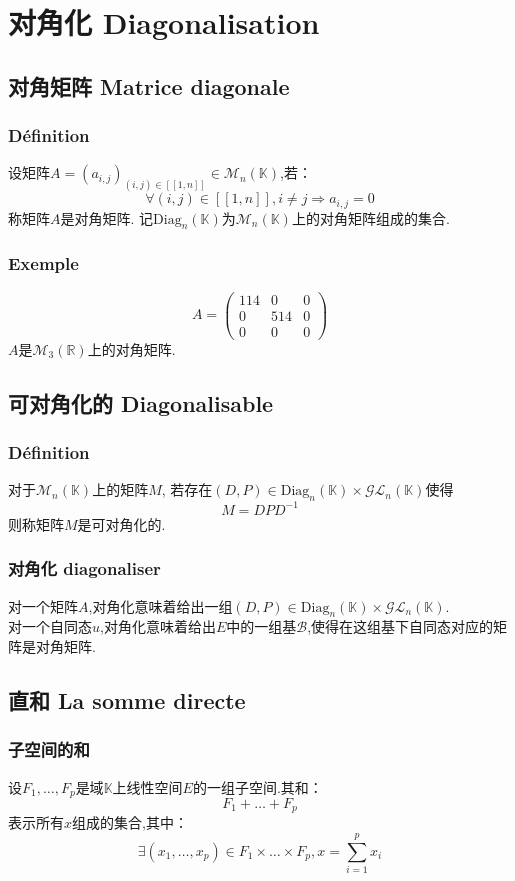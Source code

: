 \documentclass[12pt, a4paper, oneside]{ctexbook}
\newcommand{\R }{\mathbb{R}}%
\begin{document}
\section{对角化 Diagonalisation}
  \subsection{对角矩阵 Matrice diagonale}
  \subsubsection{Définition}
  设矩阵$A=(a_{i,j})_{(i,j)\in[\![1,n]\!]}\in\mathcal{M}_n(\mathbb{K})$,若：
  $$
    \forall(i,j)\in[\![1,n]\!], i\neq j\Rightarrow a_{i,j}=0
  $$
  称矩阵$A$是对角矩阵.
  记$\mbox{Diag}_n(\mathbb{K})$为$\mathcal{M}_n(\mathbb{K})$上的对角矩阵组成的集合.
  \subsubsection{Exemple}
  $$
  A=\begin{pmatrix} 114 & 0 & 0 \\ 0 & 514 & 0 \\ 0 & 0 & 0 \end{pmatrix}
  $$
  $A$是$\mathcal{M}_3(\R)$上的对角矩阵.
  \subsection{可对角化的 Diagonalisable}
  \subsubsection{Définition}
  对于$\mathcal{M}_n(\mathbb{K})$上的矩阵$M$,
  若存在$(D,P)\in\mbox{Diag}_n(\mathbb{K})\times\mathcal{G} \mathcal{L} _n(\mathbb{K})$使得
  $$
  M=DPD^{-1}
  $$
  则称矩阵$M$是可对角化的.
  \subsubsection{对角化 diagonaliser}
  对一个矩阵$A$,对角化意味着给出一组$(D,P)\in\mbox{Diag}_n(\mathbb{K})\times\mathcal{G} \mathcal{L} _n(\mathbb{K})$.\\

  对一个自同态$u$,对角化意味着给出$E$中的一组基$\mathcal{B}$,使得在这组基下自同态对应的矩阵是对角矩阵.
  \subsection{直和 La somme directe}
  \subsubsection{子空间的和}
  设$F_1,\dots,F_p$是域$\mathbb{K}$上线性空间$E$的一组子空间.其和：
  $$
  F_1+\dots+F_p
  $$
  表示所有$x$组成的集合,其中：
  $$
  \exists(x_1,\dots,x_p)\in F_1\times\dots\times F_p, x=\sum_{i=1}^{p}x_i
  $$
\end{document}
